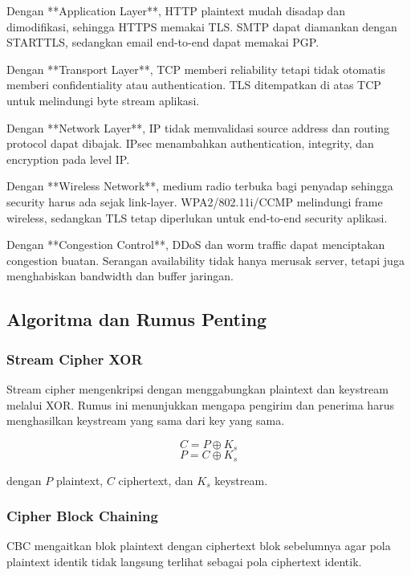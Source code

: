 Dengan **Application Layer**, HTTP plaintext mudah disadap dan dimodifikasi, sehingga HTTPS memakai TLS. SMTP dapat diamankan dengan STARTTLS, sedangkan email end-to-end dapat memakai PGP.

Dengan **Transport Layer**, TCP memberi reliability tetapi tidak otomatis memberi confidentiality atau authentication. TLS ditempatkan di atas TCP untuk melindungi byte stream aplikasi.

Dengan **Network Layer**, IP tidak memvalidasi source address dan routing protocol dapat dibajak. IPsec menambahkan authentication, integrity, dan encryption pada level IP.

Dengan **Wireless Network**, medium radio terbuka bagi penyadap sehingga security harus ada sejak link-layer. WPA2/802.11i/CCMP melindungi frame wireless, sedangkan TLS tetap diperlukan untuk end-to-end security aplikasi.

Dengan **Congestion Control**, DDoS dan worm traffic dapat menciptakan congestion buatan. Serangan availability tidak hanya merusak server, tetapi juga menghabiskan bandwidth dan buffer jaringan.

\subsection{Algoritma dan Rumus Penting}

\subsubsection{Stream Cipher XOR}
\begin{jawab}
Stream cipher mengenkripsi dengan menggabungkan plaintext dan keystream melalui XOR. Rumus ini menunjukkan mengapa pengirim dan penerima harus menghasilkan keystream yang sama dari key yang sama.
\end{jawab}

\begin{equation}
    C = P \oplus K_s
    \label{eq:stream-cipher}
\end{equation}
\begin{equation}
    P = C \oplus K_s
    \label{eq:stream-decipher}
\end{equation}

dengan $P$ plaintext, $C$ ciphertext, dan $K_s$ keystream.

\subsubsection{Cipher Block Chaining}
\begin{jawab}
CBC mengaitkan blok plaintext dengan ciphertext blok sebelumnya agar pola plaintext identik tidak langsung terlihat sebagai pola ciphertext identik.
\end{jawab}

